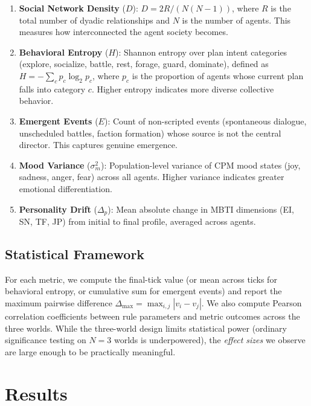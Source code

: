 \documentclass[11pt]{article}
\begin{document}
\begin{enumerate}[leftmargin=*,nosep]
    \item \textbf{Social Network Density} ($D$): $D = 2R / (N(N-1))$, where $R$ is the total number of dyadic relationships and $N$ is the number of agents. This measures how interconnected the agent society becomes.
    \item \textbf{Behavioral Entropy} ($H$): Shannon entropy over plan intent categories (explore, socialize, battle, rest, forage, guard, dominate), defined as $H = -\sum_{c} p_c \log_2 p_c$, where $p_c$ is the proportion of agents whose current plan falls into category $c$. Higher entropy indicates more diverse collective behavior.
    \item \textbf{Emergent Events} ($E$): Count of non-scripted events (spontaneous dialogue, unscheduled battles, faction formation) whose source is not the central director. This captures genuine emergence.
    \item \textbf{Mood Variance} ($\sigma^2_m$): Population-level variance of CPM mood states (joy, sadness, anger, fear) across all agents. Higher variance indicates greater emotional differentiation.
    \item \textbf{Personality Drift} ($\Delta_p$): Mean absolute change in MBTI dimensions (EI, SN, TF, JP) from initial to final profile, averaged across agents.
\end{enumerate}

\subsection{Statistical Framework}

For each metric, we compute the final-tick value (or mean across ticks for behavioral entropy, or cumulative sum for emergent events) and report the maximum pairwise difference $\Delta_{\max} = \max_{i,j} |v_i - v_j|$.
We also compute Pearson correlation coefficients between rule parameters and metric outcomes across the three worlds.
While the three-world design limits statistical power (ordinary significance testing on $N=3$ worlds is underpowered), the \emph{effect sizes} we observe are large enough to be practically meaningful.

\section{Results}
\label{sec:results}
\end{document}
